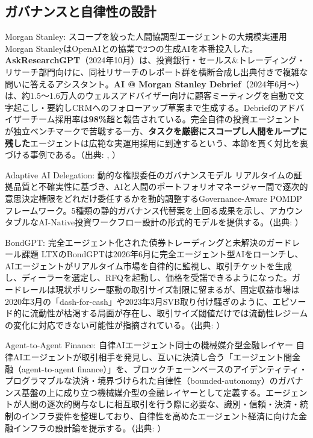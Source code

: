\subsection{ガバナンスと自律性の設計}

\begin{casestudy}{Morgan Stanley: スコープを絞った人間協調型エージェントの大規模実運用}
Morgan StanleyはOpenAIとの協業で2つの生成AIを本番投入した。\textbf{AskResearchGPT}（2024年10月）は、投資銀行・セールス\&トレーディング・リサーチ部門向けに、同社リサーチのレポート群を横断合成し出典付きで複雑な問いに答えるアシスタント。\textbf{AI @ Morgan Stanley Debrief}（2024年6月〜）は、約1.5〜1.6万人のウェルスアドバイザー向けに顧客ミーティングを自動で文字起こし・要約しCRMへのフォローアップ草案まで生成する。Debriefのアドバイザーチーム採用率は\textbf{98\%}超と報告されている。完全自律の投資エージェントが独立ベンチマークで苦戦する一方、\textbf{タスクを厳密にスコープし人間をループに残した}エージェントは広範な実運用採用に到達するという、本節を貫く対比を裏づける事例である。（出典: \cite{x04askresearchgpt2024}, \cite{x04morganstanleyai_nd}）
\end{casestudy}

\begin{casestudy}{Adaptive AI Delegation: 動的な権限委任のガバナンスモデル}
リアルタイムの証拠品質と不確実性に基づき、AIと人間のポートフォリオマネージャー間で逐次的意思決定権限をどれだけ委任するかを動的調整するGovernance-Aware POMDPフレームワーク。5種類の静的ガバナンス代替案を上回る成果を示し、アカウンタブルなAI-Native投資ワークフロー設計の形式的モデルを提供する。（出典: \cite{adaptiveai2026}）
\end{casestudy}

\begin{casestudy}{BondGPT: 完全エージェント化された債券トレーディングと未解決のガードレール課題}
LTXのBondGPTは2026年6月に完全エージェント型AIをローンチし、AIエージェントがリアルタイム市場を自律的に監視し、取引チケットを生成し、ディーラーを選定し、RFQを起動し、価格を受諾できるようになった。ガードレールは現状ポリシー駆動の取引サイズ制限に留まるが、固定収益市場は2020年3月の「dash-for-cash」や2023年3月SVB取り付け騒ぎのように、エピソード的に流動性が枯渇する局面が存在し、取引サイズ閾値だけでは流動性レジームの変化に対応できない可能性が指摘されている。（出典: \cite{prnewswirendbondgpt}）
\end{casestudy}

\begin{casestudy}{Agent-to-Agent Finance: 自律AIエージェント同士の機械媒介型金融レイヤー}
自律AIエージェントが取引相手を発見し、互いに決済し合う「エージェント間金融（agent-to-agent finance）」を、ブロックチェーンベースのアイデンティティ・プログラマブルな決済・境界づけられた自律性（bounded-autonomy）のガバナンス基盤の上に成り立つ機械媒介型の金融レイヤーとして定義する。エージェントが人間の逐次的関与なしに相互取引を行う際に必要な、識別・信頼・決済・統制のインフラ要件を整理しており、自律性を高めたエージェント経済に向けた金融インフラの設計論を提示する。（出典: \cite{agenttoagentfinance2026}）
\end{casestudy}

